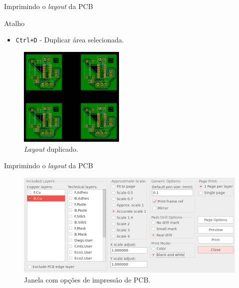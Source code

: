 \documentclass{beamer}
\begin{document}
\begin{frame}{Imprimindo o \textit{layout} da PCB}
	\begin{block}{Atalho}
		\begin{itemize}
			\item \texttt{Ctrl+D} - Duplicar área selecionada.
		\end{itemize}
	\end{block}
	\begin{figure}
		\centering
		\includegraphics[width=0.45\textwidth]{Imagens/39_duplicate.png}
		\caption{\textit{Layout} duplicado.}
	\end{figure}
\end{frame}

\begin{frame}{Imprimindo o \textit{layout} da PCB}
	\begin{figure}
		\centering
		\includegraphics[width=1\textwidth]{Imagens/41_print_janela.png}
		\caption{Janela com opções de impressão de PCB.}
	\end{figure}
\end{frame}
\end{document}
